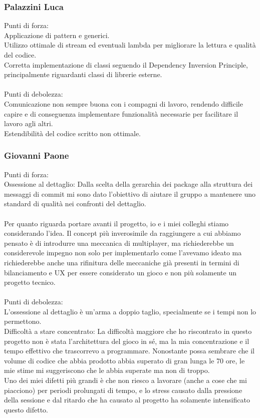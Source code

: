 \documentclass[a4paper,12pt]{report}
\begin{document}
\subsubsection{Palazzini Luca}
Punti di forza: \\
%
Applicazione di pattern e generici. \\
%
Utilizzo ottimale di stream ed eventuali lambda per migliorare la lettura e qualità del codice. \\
%
Corretta implementazione di classi seguendo il Dependency Inversion Principle, principalmente riguardanti classi di librerie esterne. \\
\\
Punti di debolezza: \\
%
Comunicazione non sempre buona con i compagni di lavoro, rendendo difficile capire e di conseguenza implementare funzionalità necessarie per facilitare il lavoro agli altri. \\
%
Estendibilità del codice scritto non ottimale.
\subsubsection{Giovanni Paone}
Punti di forza: \\
%
Ossessione al dettaglio: Dalla scelta della gerarchia dei package alla struttura dei messaggi di commit mi sono dato l’obiettivo di aiutare il gruppo a mantenere uno standard di qualità nei confronti del dettaglio. \\
\\
Per quanto riguarda portare avanti il progetto, io e i miei colleghi stiamo considerando l’idea.
%
Il concept più inverosimile da raggiungere a cui abbiamo pensato è di introdurre una meccanica di multiplayer, ma richiederebbe un considerevole impegno non solo per implementarlo come l’avevamo ideato ma richiederebbe anche una rifinitura delle meccaniche già presenti in termini di bilanciamento e UX per essere considerato un gioco e non più solamente un progetto tecnico. \\
\\
Punti di debolezza: \\
L’ossessione al dettaglio è un’arma a doppio taglio, specialmente se i tempi non lo permettono. \\
%
Difficoltà a stare concentrato: La difficoltà maggiore che ho riscontrato in questo progetto non è stata l’architettura del gioco in sé, ma la mia concentrazione e il tempo effettivo che trascorrevo a programmare.
%
Nonostante possa sembrare che il volume di codice che abbia prodotto abbia superato di gran lunga le 70 ore, le mie stime mi suggeriscono che le abbia superate ma non di troppo. \\
%
Uno dei miei difetti più grandi è che non riesco a lavorare (anche a cose che mi piacciono) per periodi prolungati di tempo, e lo stress causato dalla pressione della sessione e dal ritardo che ha causato al progetto ha solamente intensificato questo difetto.
\end{document}
